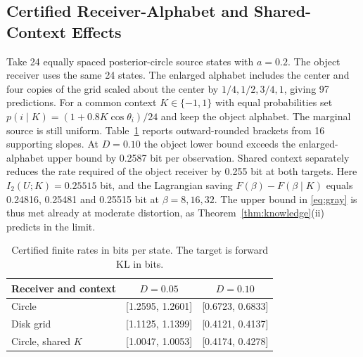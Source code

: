 \documentclass[10pt,journal]{IEEEtran}
\begin{document}
\subsection{Certified Receiver-Alphabet and Shared-Context Effects}
Take 24 equally spaced posterior-circle source states with $a=0.2$. The object receiver uses the same 24 states. The enlarged alphabet includes the center and four copies of the grid scaled about the center by $1/4,1/2,3/4,1$, giving 97 predictions. For a common context $K\in\{-1,1\}$ with equal probabilities set $p(i\mid K)=(1+0.8K\cos\theta_i)/24$ and keep the object alphabet. The marginal source is still uniform. Table~\ref{tab:finite} reports outward-rounded brackets from 16 supporting slopes. At $D=0.10$ the object lower bound exceeds the enlarged-alphabet upper bound by 0.2587 bit per observation. Shared context separately reduces the rate required of the object receiver by 0.255 bit at both targets. Here $I_2(U;K)=0.25515$ bit, and the Lagrangian saving $F(\beta)-F(\beta\mid K)$ equals 0.24816, 0.25481 and 0.25515 bit at $\beta=8,16,32$. The upper bound in \eqref{eq:gray} is thus met already at moderate distortion, as Theorem~\ref{thm:knowledge}(ii) predicts in the limit.
\begin{table}[t]
\caption{Certified finite rates in bits per state. The target is forward KL in bits.}\label{tab:finite}\centering
\begin{tabular}{lcc}\toprule
Receiver and context & $D=0.05$ & $D=0.10$\\\midrule
Circle & [1.2595, 1.2601] & [0.6723, 0.6833]\\
Disk grid & [1.1125, 1.1399] & [0.4121, 0.4137]\\
Circle, shared $K$ & [1.0047, 1.0053] & [0.4174, 0.4278]\\\bottomrule
\end{tabular}\end{table}
\end{document}

